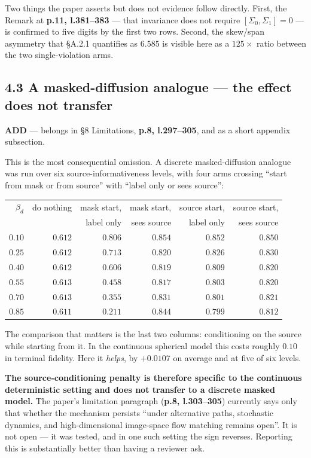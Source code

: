 \documentclass[11pt]{article}
\newcommand{\ADD}{\textcolor{add}{\textbf{ADD}}}
\newcommand{\pl}[2]{\textbf{p.#1, l.#2}}
\begin{document}
Two things the paper asserts but does not evidence follow directly. First, the Remark at
\pl{11}{381--383} --- that invariance does not require $[\Sigma_0,\Sigma_1]=0$ --- is confirmed
to five digits by the first two rows. Second, the skew/span asymmetry that \S A.2.1 quantifies as
$6.585$ is visible here as a $125\times$ ratio between the two single-violation arms.

\subsection*{4.3 A masked-diffusion analogue --- the effect does not transfer}

\ADD{} --- belongs in \S8 Limitations, \pl{8}{297--305}, and as a short appendix subsection.

This is the most consequential omission. A discrete masked-diffusion analogue was run over six
source-informativeness levels, with four arms crossing ``start from mask or from source'' with
``label only or sees source'':

\begin{center}
\small
\begin{tabular}{@{}rrrrrr@{}}
\toprule
$\beta_d$ & do nothing & mask start, & mask start, & source start, & source start,\\
          &            & label only  & sees source & label only    & sees source\\
\midrule
$0.10$ & $0.612$ & $0.806$ & $0.854$ & $0.852$ & $0.850$\\
$0.25$ & $0.612$ & $0.713$ & $0.820$ & $0.826$ & $0.830$\\
$0.40$ & $0.612$ & $0.606$ & $0.819$ & $0.809$ & $0.820$\\
$0.55$ & $0.613$ & $0.458$ & $0.817$ & $0.803$ & $0.820$\\
$0.70$ & $0.613$ & $0.355$ & $0.831$ & $0.801$ & $0.821$\\
$0.85$ & $0.611$ & $0.211$ & $0.844$ & $0.799$ & $0.812$\\
\bottomrule
\end{tabular}
\end{center}

The comparison that matters is the last two columns: conditioning on the source while starting
from it. In the continuous spherical model this costs roughly $0.10$ in terminal fidelity. Here
it \emph{helps}, by $+0.0107$ on average and at five of six levels.

\textbf{The source-conditioning penalty is therefore specific to the continuous deterministic
setting and does not transfer to a discrete masked model.} The paper's limitation paragraph
(\pl{8}{303--305}) currently says only that whether the mechanism persists ``under alternative
paths, stochastic dynamics, and high-dimensional image-space flow matching remains open''. It is
not open --- it was tested, and in one such setting the sign reverses. Reporting this is
substantially better than having a reviewer ask.
\end{document}
